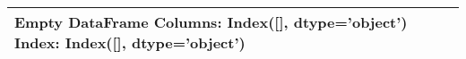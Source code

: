 \begin{tabular}{l}
\toprule
Empty DataFrame
Columns: Index([], dtype='object')
Index: Index([], dtype='object') \\ \hline
\bottomrule
\end{tabular}
